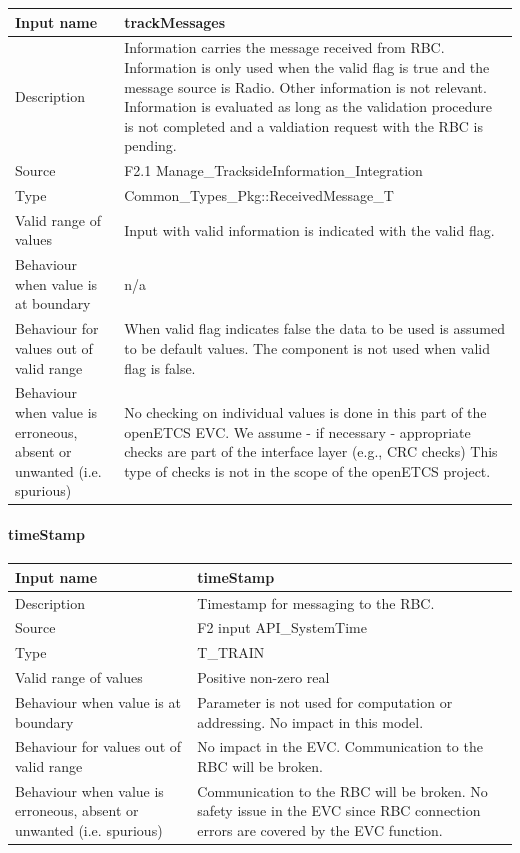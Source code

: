 \begin{longtable}{p{}p{}}
\toprule
Input name				& trackMessages \\
\midrule
Description				& Information carries the message received from RBC. Information is only used when the valid flag is true and the message source is Radio. Other information is not relevant. Information is evaluated as long as the validation procedure is not completed and a valdiation request with the RBC is pending. \\
\midrule
Source					& F2.1 Manage\_TracksideInformation\_Integration\\ 
\midrule
Type					& Common\_Types\_Pkg::ReceivedMessage\_T \\
\midrule
Valid range of values	& Input with valid information is indicated with the valid flag.\\
\midrule
Behaviour when value is at boundary	& n/a\\
\midrule
Behaviour for values out of valid range	& 
When valid flag indicates false the data to be used is assumed to be default values. The component is not used when valid flag is false.\\
\midrule
Behaviour when value is erroneous, absent or unwanted (i.e. spurious) & 
No checking on individual values is done in this part of the openETCS EVC. We assume - if necessary - appropriate checks are part of the interface layer (e.g., CRC checks) This type of checks is not in the scope of the openETCS project.\\

\bottomrule
\end{longtable}

\paragraph{timeStamp}

\begin{longtable}{p{}p{}}
\toprule
Input name				& timeStamp \\
\midrule
Description				& Timestamp for messaging to the RBC.\\
\midrule
Source					& F2 input API\_SystemTime\\ 
\midrule
Type					& T\_TRAIN\\
\midrule
Valid range of values	& Positive non-zero real\\
\midrule
Behaviour when value is at boundary	& Parameter is not used for computation or addressing. No impact in this model.\\
\midrule
Behaviour for values out of valid range	& No impact in the EVC. Communication to the RBC will be broken.\\
\midrule
Behaviour when value is erroneous, absent or unwanted (i.e. spurious) & Communication to the RBC will be broken. No safety issue in the EVC since RBC connection errors are covered by the EVC function.
\\
\bottomrule
\end{longtable}


